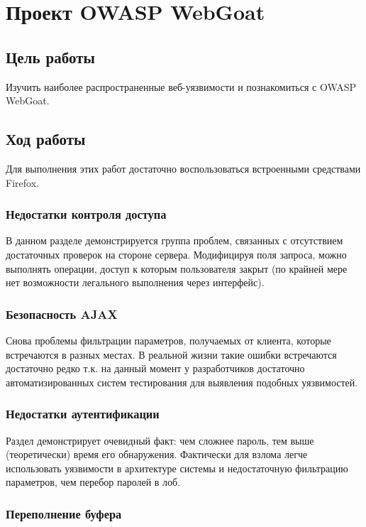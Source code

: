 \newpage
\section{Проект OWASP WebGoat}

\subsection{Цель работы}

Изучить наиболее распространенные веб-уязвимости и познакомиться с OWASP WebGoat.

\subsection{Ход работы}

Для выполнения этих работ достаточно воспользоваться встроенными средствами Firefox.

\subsubsection{Недостатки контроля доступа}

В данном разделе демонстрируется группа проблем, связанных с отсутствием достаточных проверок на стороне сервера. Модифицируя поля запроса, можно выполнять операции, доступ к которым пользователя закрыт (по крайней мере нет возможности легального выполнения через интерфейс).

\subsubsection{Безопасность AJAX}

Снова проблемы фильтрации параметров, получаемых от клиента, которые встречаются в разных местах. В реальной жизни такие ошибки встречаются достаточно редко т.к. на данный момент у разработчиков достаточно автоматизированных систем тестирования для выявления подобных уязвимостей.

\subsubsection{Недостатки аутентификации}

Раздел демонстрирует очевидный факт: чем сложнее пароль, тем выше (теоретически) время его обнаружения. Фактически для взлома легче использовать уязвимости в архитектуре системы и недостаточную фильтрацию параметров, чем перебор паролей в лоб.

\subsubsection{Переполнение буфера}

